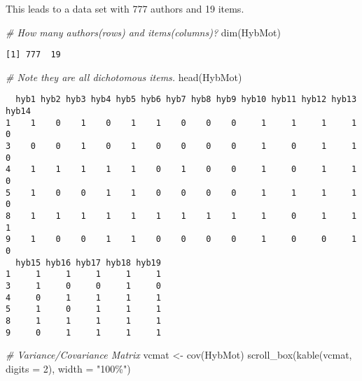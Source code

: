 \documentclass[
]{book}
\newenvironment{Shaded}{\begin{snugshade}}{\end{snugshade}}
\newcommand{\AttributeTok}[1]{\textcolor[rgb]{0.77,0.63,0.00}{#1}}
\newcommand{\CommentTok}[1]{\textcolor[rgb]{0.56,0.35,0.01}{\textit{#1}}}
\newcommand{\DecValTok}[1]{\textcolor[rgb]{0.00,0.00,0.81}{#1}}
\newcommand{\FunctionTok}[1]{\textcolor[rgb]{0.00,0.00,0.00}{#1}}
\newcommand{\NormalTok}[1]{#1}
\newcommand{\OtherTok}[1]{\textcolor[rgb]{0.56,0.35,0.01}{#1}}
\newcommand{\StringTok}[1]{\textcolor[rgb]{0.31,0.60,0.02}{#1}}
\begin{document}
This leads to a data set with 777 authors and 19 items.

\begin{Shaded}
\begin{Highlighting}[]
\CommentTok{\# How many authors(rows) and items(columns)?}
\FunctionTok{dim}\NormalTok{(HybMot)}
\end{Highlighting}
\end{Shaded}

\begin{verbatim}
[1] 777  19
\end{verbatim}

\begin{Shaded}
\begin{Highlighting}[]
\CommentTok{\# Note they are all dichotomous items.}
\FunctionTok{head}\NormalTok{(HybMot)}
\end{Highlighting}
\end{Shaded}

\begin{verbatim}
  hyb1 hyb2 hyb3 hyb4 hyb5 hyb6 hyb7 hyb8 hyb9 hyb10 hyb11 hyb12 hyb13 hyb14
1    1    0    1    0    1    1    0    0    0     1     1     1     1     0
3    0    0    1    0    1    0    0    0    0     1     0     1     1     0
4    1    1    1    1    1    0    1    0    0     1     0     1     1     0
5    1    0    0    1    1    0    0    0    0     1     1     1     1     0
8    1    1    1    1    1    1    1    1    1     1     0     1     1     1
9    1    0    0    1    1    0    0    0    0     1     0     0     1     0
  hyb15 hyb16 hyb17 hyb18 hyb19
1     1     1     1     1     1
3     1     0     0     1     0
4     0     1     1     1     1
5     1     0     1     1     1
8     1     1     1     1     1
9     0     1     1     1     1
\end{verbatim}

\begin{Shaded}
\begin{Highlighting}[]
\CommentTok{\# Variance/Covariance Matrix}
\NormalTok{vcmat }\OtherTok{\textless{}{-}} \FunctionTok{cov}\NormalTok{(HybMot)}
\FunctionTok{scroll\_box}\NormalTok{(}\FunctionTok{kable}\NormalTok{(vcmat, }\AttributeTok{digits =} \DecValTok{2}\NormalTok{), }\AttributeTok{width =} \StringTok{"100\%"}\NormalTok{)}
\end{Highlighting}
\end{Shaded}
\end{document}
